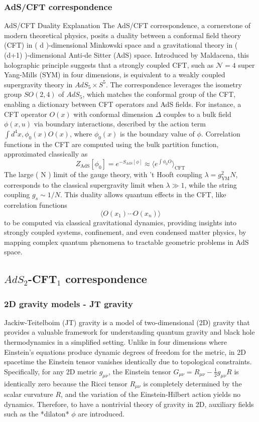 \subsubsection{AdS/CFT correspondence}

AdS/CFT Duality Explanation
The AdS/CFT correspondence, a cornerstone of modern theoretical physics, posits a duality between a conformal field theory (CFT) in ( d )-dimensional Minkowski space and a gravitational theory in ( (d+1) )-dimensional Anti-de Sitter (AdS) space. Introduced by Maldacena, this holographic principle suggests that a strongly coupled CFT, such as \( \mathcal{N}=4 \) super Yang-Mills (SYM) in four dimensions, is equivalent to a weakly coupled supergravity theory in \( AdS_5 \times S^5 \). The correspondence leverages the isometry group \( SO(2,4) \) of \( AdS_5 \), which matches the conformal group of the CFT, enabling a dictionary between CFT operators and AdS fields. For instance, a CFT operator \( O(x) \) with conformal dimension \( \Delta \) couples to a bulk field \( \phi(x, u) \) via boundary interactions, described by the action term \( \int d^4 x , \phi_0(x) O(x) \), where \( \phi_0(x) \) is the boundary value of \( \phi \). Correlation functions in the CFT are computed using the bulk partition function, approximated classically as \[Z_{\text{AdS}}[\phi_0] = e^{-S_{\text{AdS}}[\phi]} \approx \langle e^{\int \phi_0 O} \rangle_{\text{CFT}}\] The large ( N ) limit of the gauge theory, with ’t Hooft coupling \( \lambda = g_{\text{YM}}^2 N \), corresponds to the classical supergravity limit when \( \lambda \gg 1 \), while the string coupling \( g_s \sim 1/N \). This duality allows quantum effects in the CFT, like correlation functions \[\langle O(x_1) \cdots O(x_n) \rangle\] to be computed via classical gravitational dynamics, providing insights into strongly coupled systems, confinement, and even condensed matter physics, by mapping complex quantum phenomena to tractable geometric problems in AdS space.

\subsection{$AdS_2$-CFT$_1$ correspondence}

\subsubsection{2D gravity models - JT gravity}
Jackiw-Teitelboim (JT) gravity is a model of two-dimensional (2D) gravity that provides a valuable framework for understanding quantum gravity and black hole thermodynamics in a simplified setting. Unlike in four dimensions where Einstein's equations produce dynamic degrees of freedom for the metric, in 2D spacetime the Einstein tensor vanishes identically due to topological constraints. Specifically, for any 2D metric $g_{\mu\nu}$, the Einstein tensor $G_{\mu\nu} = R_{\mu\nu} - \frac{1}{2}g_{\mu\nu}R$ is identically zero because the Ricci tensor $R_{\mu\nu}$ is completely determined by the scalar curvature $R$, and the variation of the Einstein-Hilbert action yields no dynamics. Therefore, to have a nontrivial theory of gravity in 2D, auxiliary fields such as the *dilaton* $\phi$ are introduced.

